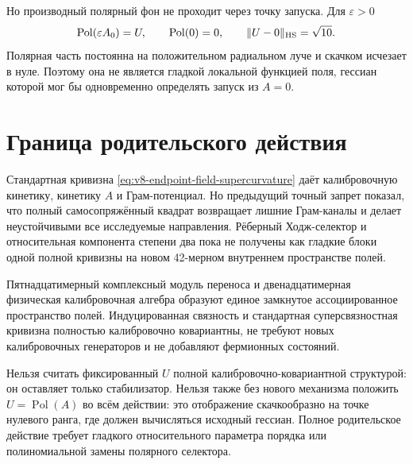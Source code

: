 Но производный полярный фон не проходит через точку запуска. Для
$\varepsilon>0$
\begin{equation}
 \operatorname{Pol}(\varepsilon A_0)=U,
 \qquad
 \operatorname{Pol}(0)=0,
 \qquad
 \|U-0\|_{\rm HS}=\sqrt{10}.
 \label{eq:v8-polar-rank-zero-jump}
\end{equation}
Полярная часть постоянна на положительном радиальном луче и скачком исчезает
в нуле. Поэтому она не является гладкой локальной функцией поля, гессиан
которой мог бы одновременно определять запуск из $A=0$.

\section{Граница родительского действия}

Стандартная кривизна \eqref{eq:v8-endpoint-field-supercurvature} даёт
калибровочную кинетику, кинетику $A$ и Грам-потенциал. Но предыдущий точный запрет
показал, что полный самосопряжённый квадрат возвращает лишние Грам-каналы и
делает неустойчивыми все исследуемые направления. Рёберный Ходж-селектор и
относительная компонента степени два пока не получены как гладкие блоки одной
полной кривизны на новом 42-мерном внутреннем пространстве полей.

\begin{theorem}
Пятнадцатимерный комплексный модуль переноса и двенадцатимерная физическая
калибровочная алгебра образуют единое замкнутое ассоциированное пространство полей.
Индуцированная связность и стандартная суперсвязностная кривизна полностью
калибровочно ковариантны, не требуют новых калибровочных генераторов и не добавляют
фермионных состояний.
\end{theorem}

\begin{nogocriterion}
Нельзя считать фиксированный $U$ полной калибровочно-ковариантной структурой: он
оставляет только стабилизатор. Нельзя также без нового механизма положить
$U=\operatorname{Pol}(A)$ во всём действии: это отображение скачкообразно на
точке нулевого ранга, где должен вычисляться исходный гессиан. Полное родительское
действие требует гладкого относительного параметра порядка или полиномиальной
замены полярного селектора.
\end{nogocriterion}

